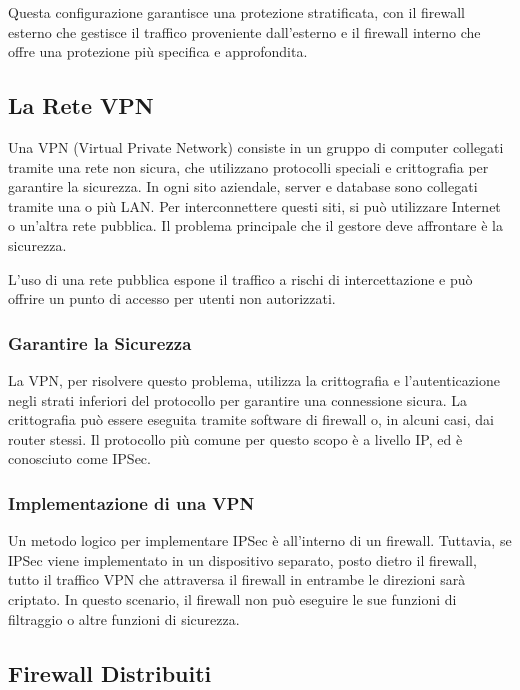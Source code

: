 Questa configurazione garantisce una protezione stratificata, con il firewall esterno che gestisce il traffico proveniente dall'esterno e il firewall interno che offre una protezione più specifica e approfondita.

\subsection{La Rete VPN}

Una VPN (Virtual Private Network) consiste in un gruppo di computer collegati tramite una rete non sicura, che utilizzano protocolli speciali e crittografia per garantire la sicurezza. In ogni sito aziendale, server e database sono collegati tramite una o più LAN. Per interconnettere questi siti, si può utilizzare Internet o un'altra rete pubblica. Il problema principale che il gestore deve affrontare è la sicurezza.

L'uso di una rete pubblica espone il traffico a rischi di intercettazione e può offrire un punto di accesso per utenti non autorizzati.

\subsubsection{Garantire la Sicurezza}

La VPN, per risolvere questo problema, utilizza la crittografia e l'autenticazione negli strati inferiori del protocollo per garantire una connessione sicura. La crittografia può essere eseguita tramite software di firewall o, in alcuni casi, dai router stessi. Il protocollo più comune per questo scopo è a livello IP, ed è conosciuto come IPSec.

\subsubsection{Implementazione di una VPN}

Un metodo logico per implementare IPSec è all'interno di un firewall. Tuttavia, se IPSec viene implementato in un dispositivo separato, posto dietro il firewall, tutto il traffico VPN che attraversa il firewall in entrambe le direzioni sarà criptato. In questo scenario, il firewall non può eseguire le sue funzioni di filtraggio o altre funzioni di sicurezza.

\subsection{Firewall Distribuiti}

